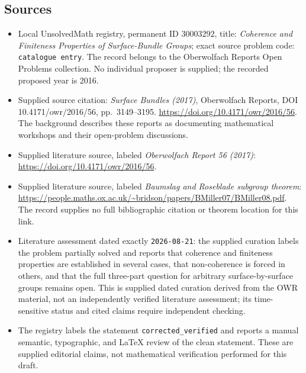 \documentclass[11pt]{article}
\begin{document}
\subsection{Sources}
\begin{itemize}
\item Local UnsolvedMath registry, permanent ID \(30003292\), title: \emph{Coherence and Finiteness Properties of Surface-Bundle Groups}; exact source problem code: \texttt{catalogue entry}. The record belongs to the Oberwolfach Reports Open Problems collection. No individual proposer is supplied; the recorded proposed year is 2016.
\item Supplied source citation: \emph{Surface Bundles (2017)}, Oberwolfach Reports, DOI 10.4171/owr/2016/56, pp.\ 3149--3195. \url{https://doi.org/10.4171/owr/2016/56}. The background describes these reports as documenting mathematical workshops and their open-problem discussions.
\item Supplied literature source, labeled \emph{Oberwolfach Report 56 (2017)}: \url{https://doi.org/10.4171/owr/2016/56}.
\item Supplied literature source, labeled \emph{Baumslag and Roseblade subgroup theorem}: \url{https://people.maths.ox.ac.uk/~bridson/papers/BMiller07/BMiller08.pdf}. The record supplies no full bibliographic citation or theorem location for this link.
\item Literature assessment dated exactly \texttt{2026-08-21}: the supplied curation labels the problem partially solved and reports that coherence and finiteness properties are established in several cases, that non-coherence is forced in others, and that the full three-part question for arbitrary surface-by-surface groups remains open. This is supplied dated curation derived from the OWR material, not an independently verified literature assessment; its time-sensitive status and cited claims require independent checking.
\item The registry labels the statement \texttt{corrected\_verified} and reports a manual semantic, typographic, and LaTeX review of the clean statement. These are supplied editorial claims, not mathematical verification performed for this draft.
\end{itemize}
\end{document}
